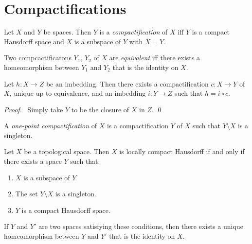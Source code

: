 \section{Compactifications}

\begin{df}[Compactification]
  Let $X$ and $Y$ be spaces. Then $Y$ is a \emph{compactification} of $X$ iff
  $Y$ is a compact Hausdorff space and $X$ is a subspace of $Y$ with
  $\overline{X} = Y$.

  Two compcactificatons $Y_1$, $Y_2$ of $X$ are \emph{equivalent} iff there exists a homeomorphism between $Y_1$ and $Y_2$ that is the identity on $X$.
\end{df}

\begin{lm}
  \label{lm:topology:compactification:factorization}
  Let $h : X \rightarrow Z$ be an imbedding. Then there exists a compactification $c : X \rightarrow Y$ of $X$, unique up to equivalence,
  and an imbedding $i : Y \rightarrow Z$ such that $h = i \circ c$.
\end{lm}

\begin{proof}
  \pf\ Simply take $Y$ to be the closure of $X$ in $Z$. \qed
\end{proof}

\begin{df}
  A \emph{one-point compactification} of $X$ is a compactification $Y$ of $X$
  such that $Y \setminus X$ is a singleton.
\end{df}

\begin{thm}
  \label{thm:topology:locally_compact:one_point_compactification}
  Let $X$ be a topological space. Then $X$ is locally compact Hausdorff if
  and
  only if there exists a space $Y$ such that:
  \begin{enumerate}
    \item $X$ is a subspace of $Y$
    \item The set $Y \setminus X$ is a singleton.
    \item $Y$ is a compact Hausdorff space.
  \end{enumerate}
  If $Y$ and $Y'$ are two spaces satisfying these conditions, then there
  exists a
  unique homeomorphism between $Y$ and $Y'$ that is the identity on $X$.
\end{thm}

